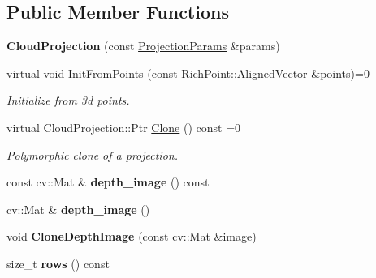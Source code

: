 \subsection*{Public Member Functions}
\begin{DoxyCompactItemize}
\item 
\mbox{\label{classdepth__clustering_1_1CloudProjection_a7abfd6e56bacd684379916af2ab60cef}} 
{\bfseries Cloud\+Projection} (const \hyperlink{classdepth__clustering_1_1ProjectionParams}{Projection\+Params} \&params)
\item 
virtual void \hyperlink{classdepth__clustering_1_1CloudProjection_aab5fa3b7362b2c4297bf9b445ccc7ff8}{Init\+From\+Points} (const Rich\+Point\+::\+Aligned\+Vector \&points)=0
\begin{DoxyCompactList}\small\item\em Initialize from 3d points. \end{DoxyCompactList}\item 
virtual Cloud\+Projection\+::\+Ptr \hyperlink{classdepth__clustering_1_1CloudProjection_ae06ff9699c1a37c535b39fa6f722fa2e}{Clone} () const =0
\begin{DoxyCompactList}\small\item\em Polymorphic clone of a projection. \end{DoxyCompactList}\item 
\mbox{\label{classdepth__clustering_1_1CloudProjection_ad1d88848db02e2d7e81e8c0e20407db5}} 
const cv\+::\+Mat \& {\bfseries depth\+\_\+image} () const
\item 
\mbox{\label{classdepth__clustering_1_1CloudProjection_aa04e09c527c7e1bc1b5ab161c5931b30}} 
cv\+::\+Mat \& {\bfseries depth\+\_\+image} ()
\item 
\mbox{\label{classdepth__clustering_1_1CloudProjection_a3e28dfda41fa497bfd54fe3c7f2a9b37}} 
void {\bfseries Clone\+Depth\+Image} (const cv\+::\+Mat \&image)
\item 
\mbox{\label{classdepth__clustering_1_1CloudProjection_a7fb447ce48a63904a758ce6eef2fc8a1}} 
size\+\_\+t {\bfseries rows} () const
\item 

\end{DoxyCompactItemize}
